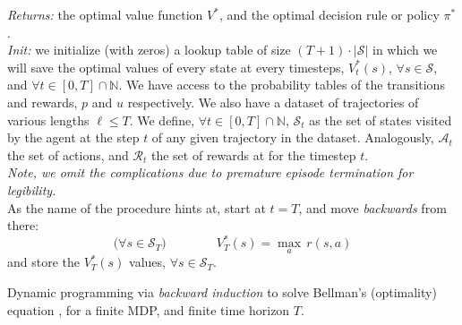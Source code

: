 \begin{algorithm}
  \emph{Returns:} the optimal value function $V^*$, and the optimal decision rule or policy $\pi^*$.
  \\
  \emph{Init:} we initialize (with zeros) a lookup table of size $(T + 1) \cdot |\mathcal{S}|$
  in which we will save the optimal values of every state at every timesteps, $V_t^*(s)$,
  $\forall s \in \mathcal{S}$, and $\forall t \in [0, T] \cap \mathbb{N}$.
  We have access to the probability tables of the transitions and rewards,
  $p$ and $u$ respectively.
  We also have a dataset of trajectories of various lengths $\ell \leq T$.
  We define, $\forall t \in [0,T] \cap \mathbb{N}$, $\mathcal{S}_t$ as the set of states
  visited by the agent at the step $t$ of any given trajectory in the dataset.
  Analogously, $\mathcal{A}_t$ the set of actions, and $\mathcal{R}_t$ the set of rewards at for the timestep $t$.
  \\
  \textit{Note, we omit the complications due to premature episode termination for legibility.}
  \\
  As the name of the procedure hints at, start at $t=T$, and move \emph{backwards} from there:
  \[
  \big( \forall s \in \mathcal{S}_T \big)
  \qquad \qquad
  V_T^*(s) = \max_{a} \, r(s, a)
  \]
  and store the $V_T^*(s)$ values, $\forall s \in \mathcal{S}_T$. \\
  \caption{Dynamic programming via \emph{backward induction}
  to solve Bellman's (optimality) equation \cite{Bellman1957-om},
  for a finite MDP, and finite time horizon $T$.}
  \label{intro:dp}
\end{algorithm}

